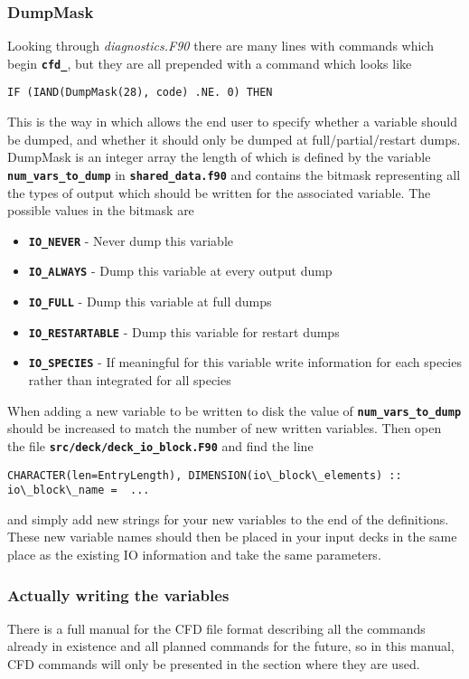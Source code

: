 \documentclass[12pt,a4paper]{article}
\newcommand{\simpleboxverbatim}{\begin{Verbatim}[obeytabs=true,frame=single,
  framerule=0.5mm,rulecolor=\color{warwickmid},formatcom=\color{black}]}
\newcommand{\inlinecode}[1]{{\color{warwickred} \bf\texttt{#1}}}
\newcommand{\EPOCH}{{\color{warwickdark}\fontfamily{phv}\selectfont{EPOCH}}}
\begin{document}
\subsubsection{DumpMask}
Looking through {\it diagnostics.F90} there are many lines with commands which
begin \inlinecode{cfd\_}, but they are all prepended with a command which looks
like
\simpleboxverbatim
  IF (IAND(DumpMask(28), code) .NE. 0) THEN
\end{Verbatim}
This is the way in which {\EPOCH} allows the end user to specify whether a
variable should be dumped, and whether it should only be dumped at
full/partial/restart dumps. DumpMask is an integer array the length of which is
defined by the variable \inlinecode{num\_vars\_to\_dump} in
\inlinecode{shared\_data.f90} and contains the bitmask representing all the
types of output which should be written for the associated variable. The
possible values in the bitmask are

\begin{itemize}
\item \inlinecode{IO\_NEVER} - Never dump this variable
\item \inlinecode{IO\_ALWAYS} - Dump this variable at every output dump
\item \inlinecode{IO\_FULL} - Dump this variable at full dumps
\item \inlinecode{IO\_RESTARTABLE} - Dump this variable for restart dumps
\item \inlinecode{IO\_SPECIES} - If meaningful for this variable write
  information for each species rather than integrated for all species
\end{itemize}

When adding a new variable to be written to disk the value of
\inlinecode{num\_vars\_to\_dump} should be increased to match the number of new
written variables. Then open the file \inlinecode{src/deck/deck\_io\_block.F90}
and find the line
\simpleboxverbatim
  CHARACTER(len=EntryLength), DIMENSION(io\_block\_elements) :: io\_block\_name =  ...
\end{Verbatim}

and simply add new strings for your new variables to the end of the
definitions. These new variable names should then be placed in your input decks
in the same place as the existing IO information and take the same parameters.

\subsubsection{Actually writing the variables}
There is a full manual for the CFD file format describing all the commands
already in existence and all planned commands for the future, so in this
manual, CFD commands will only be presented in the section where they are used.
\end{document}
